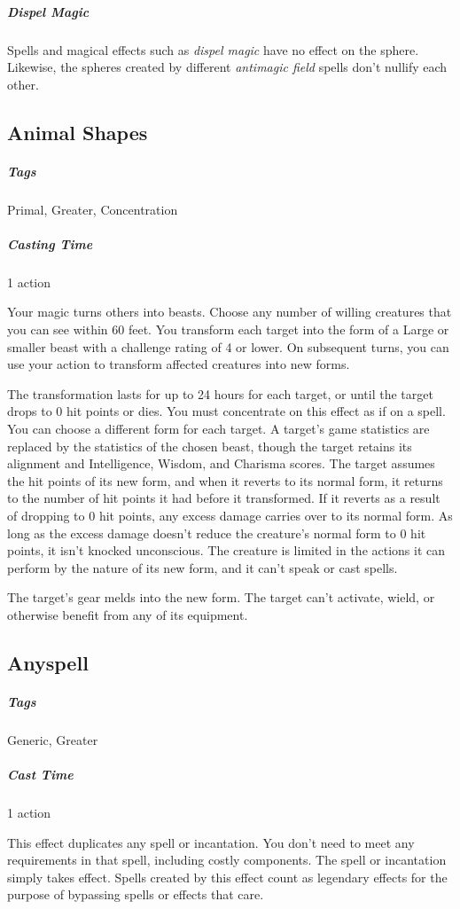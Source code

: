 \subparagraph*{Dispel Magic} Spells and magical effects such as \textit{dispel magic} have no effect on the sphere. Likewise, the spheres created by different \textit{antimagic field} spells don’t nullify each other.

\subsection{Animal Shapes}
\subparagraph*{Tags} Primal, Greater, Concentration
\subparagraph*{Casting Time} 1 action

Your magic turns others into beasts. Choose any number of willing creatures that you can see within 60 feet. You transform each target into the form of a Large or smaller beast with a challenge rating of 4 or lower. On subsequent turns, you can use your action to transform affected creatures into new forms.

The transformation lasts for up to 24 hours for each target, or until the target drops to 0 hit points or dies. You must concentrate on this effect as if on a spell. You can choose a different form for each target. A target’s game statistics are replaced by the statistics of the chosen beast, though the target retains its alignment and Intelligence, Wisdom, and Charisma scores. The target assumes the hit points of its new form, and when it reverts to its normal form, it returns to the number of hit points it had before it transformed. If it reverts as a result of dropping to 0 hit points, any excess damage carries over to its normal form. As long as the excess damage doesn’t reduce the creature’s normal form to 0 hit points, it isn’t knocked unconscious. The creature is limited in the actions it can perform by the nature of its new form, and it can’t speak or cast spells.

The target’s gear melds into the new form. The target can’t activate, wield, or otherwise benefit from any of its equipment.

\subsection{Anyspell}
\subparagraph*{Tags} Generic, Greater
\subparagraph*{Cast Time} 1 action

This effect duplicates any spell or incantation. You don’t need to meet any requirements in that spell, including costly components. The spell or incantation simply takes effect. Spells created by this effect count as legendary effects for the purpose of bypassing spells or effects that care.


